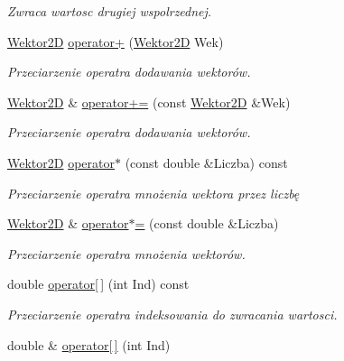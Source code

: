 \begin{DoxyCompactItemize}
\begin{DoxyCompactList}\small\item\em Zwraca wartosc drugiej wspolrzednej. \end{DoxyCompactList}\item 
\hyperlink{class_wektor2_d}{Wektor2\+D} \hyperlink{class_wektor2_d_af452ceb01296d1b2a00104ef169b5380}{operator+} (\hyperlink{class_wektor2_d}{Wektor2\+D} Wek)
\begin{DoxyCompactList}\small\item\em Przeciarzenie operatra dodawania wektorów. \end{DoxyCompactList}\item 
\hyperlink{class_wektor2_d}{Wektor2\+D} \& \hyperlink{class_wektor2_d_a839baa1a65b81fa76457323f1142ba81}{operator+=} (const \hyperlink{class_wektor2_d}{Wektor2\+D} \&Wek)
\begin{DoxyCompactList}\small\item\em Przeciarzenie operatra dodawania wektorów. \end{DoxyCompactList}\item 
\hyperlink{class_wektor2_d}{Wektor2\+D} \hyperlink{class_wektor2_d_aa64a35f3ce8e2c2c5aa0144ea76a6765}{operator$\ast$} (const double \&Liczba) const 
\begin{DoxyCompactList}\small\item\em Przeciarzenie operatra mnożenia wektora przez liczbę \end{DoxyCompactList}\item 
\hyperlink{class_wektor2_d}{Wektor2\+D} \& \hyperlink{class_wektor2_d_ad4d5d857b01f9078c21a136fb0fbad28}{operator$\ast$=} (const double \&Liczba)
\begin{DoxyCompactList}\small\item\em Przeciarzenie operatra mnożenia wektorów. \end{DoxyCompactList}\item 
\hypertarget{class_wektor2_d_ad02b05aa715c7c5f52b11a45af33a725}{double \hyperlink{class_wektor2_d_ad02b05aa715c7c5f52b11a45af33a725}{operator\mbox{[}$\,$\mbox{]}} (int Ind) const }\label{class_wektor2_d_ad02b05aa715c7c5f52b11a45af33a725}

\begin{DoxyCompactList}\small\item\em Przeciarzenie operatra indeksowania do zwracania wartosci. \end{DoxyCompactList}\item 
\hypertarget{class_wektor2_d_a1043b8760379f4720ed57913b1241400}{double \& \hyperlink{class_wektor2_d_a1043b8760379f4720ed57913b1241400}{operator\mbox{[}$\,$\mbox{]}} (int Ind)}\label{class_wektor2_d_a1043b8760379f4720ed57913b1241400}


\end{DoxyCompactItemize}
